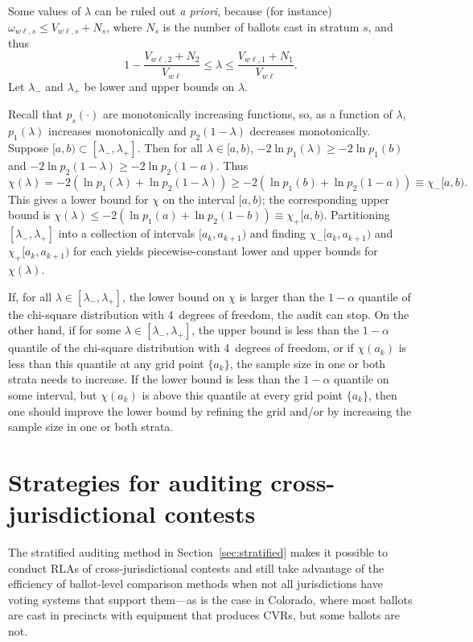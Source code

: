 \documentclass[runningheads]{llncs}
\newcommand{\beq}{\begin{equation}}
\newcommand{\eeq}{\end{equation}}
\begin{document}
Some values of $\lambda$ can be ruled out \emph{a priori}, because (for instance) $\omega_{w\ell,s} \le V_{w\ell,s}+N_s$, where $N_s$ is the number of ballots cast in stratum $s$, and thus
\beq
   1 - \frac{V_{w\ell,2}+N_2}{V_{w\ell}} \le \lambda \le \frac{V_{w\ell,1}+N_1}{V_{w\ell}}.
\eeq
Let $\lambda_-$ and $\lambda_+$ be lower and upper bounds on $\lambda$.

Recall that $p_s(\cdot)$ are monotonically increasing functions, so, as a function of $\lambda$, $p_1(\lambda)$ increases monotonically and $p_2(1-\lambda)$ decreases monotonically.
Suppose $[a, b) \subset [\lambda_-, \lambda_+]$.
Then for all $\lambda \in [a, b)$, $-2\ln p_1(\lambda) \ge -2\ln p_1(b)$ and
$-2\ln p_2(1-\lambda) \ge -2\ln p_2(1-a)$.
Thus
\beq\label{eq:lowerbound}
   \chi(\lambda) = -2(\ln p_1(\lambda)+ \ln p_2(1-\lambda))
          \ge -2(\ln p_1(b) + \ln p_2(1-a)) \equiv \chi_-[a,b).
\eeq
This gives a lower bound for $\chi$ on the interval $[a, b)$; the corresponding 
upper bound is $\chi(\lambda) \le -2(\ln p_1(a) + \ln p_2(1-b)) \equiv \chi_+[a,b)$.
Partitioning $[\lambda_-, \lambda_+]$ into a collection of intervals $[a_k, a_{k+1})$
and finding $\chi_-[a_k, a_{k+1})$ and $\chi_+[a_k, a_{k+1})$ for each
yields piecewise-constant lower and upper bounds for $\chi(\lambda)$.

If, for all $\lambda \in [\lambda_-, \lambda_+]$, the lower bound on $\chi$
is larger than the $1-\alpha$ quantile of the chi-square distribution with 4~degrees of freedom,
the audit can stop.
On the other hand, if for some $\lambda \in [\lambda_-, \lambda_+]$, 
the upper bound is less than the $1-\alpha$ quantile of the chi-square distribution with 4~degrees of freedom, 
or if $\chi(a_k)$ is less than this quantile at any grid point $\{a_k\}$,
the sample size in one or both strata needs to increase.
If the lower bound is less than the $1-\alpha$ quantile on some interval,
but $\chi(a_k)$ is above this quantile at every grid point $\{a_k\}$, then one should improve the lower bound by refining the grid and/or by increasing the sample size in one or both strata.

\section{Strategies for auditing cross-jurisdictional contests}\label{sec:combiningMethods}

The stratified auditing method in Section~\ref{sec:stratified} makes it possible to conduct RLAs of cross-jurisdictional contests and still take advantage of the efficiency of ballot-level comparison methods when not all jurisdictions have voting systems that support them---as is the case in Colorado, where most ballots are cast in precincts with equipment that produces CVRs, but some ballots are not.
\end{document}
